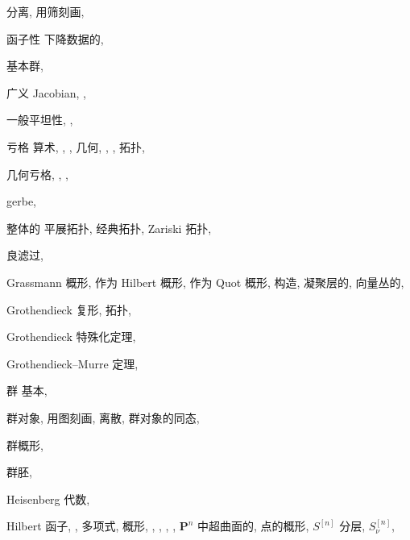 \begin{theindex}
\subitem 分离, 
\subsubitem 用筛刻画, 
\item 函子性
\subitem 下降数据的, 
\item 基本群, 
\indexspace
\item 广义 Jacobian, , 
\item 一般平坦性, , 
\item 亏格
\subitem 算术, , , 
\subitem 几何, , , 
\subitem 拓扑, 
\item 几何亏格, , , 
\item gerbe, 
\item 整体的
\subitem 平展拓扑, 
\subitem 经典拓扑, 
\subitem Zariski 拓扑, 
\item 良滤过, 
\item Grassmann 概形, 
\subitem 作为 Hilbert 概形, 
\subitem 作为 Quot 概形, 
\subitem 构造, 
\subitem 凝聚层的, 
\subitem 向量丛的, 
\item Grothendieck
\subitem 复形, 
\subitem 拓扑, 
\item Grothendieck 特殊化定理, 
\item Grothendieck--Murre 定理, 
\item 群
\subitem 基本, 
\item 群对象, 
\subitem 用图刻画, 
\subitem 离散, 
\subitem 群对象的同态, 
\item 群概形, 
\item 群胚, 
\indexspace
\item Heisenberg 代数, 
\item Hilbert
\subitem 函子, , 
\subitem 多项式, 
\subitem 概形, , , , , 
\subsubitem $\mathbf P^n$ 中超曲面的, 
\subitem 点的概形, $S^{[n]}$
\subsubitem 分层, $S_\nu^{[n]}$, 

\end{theindex}
